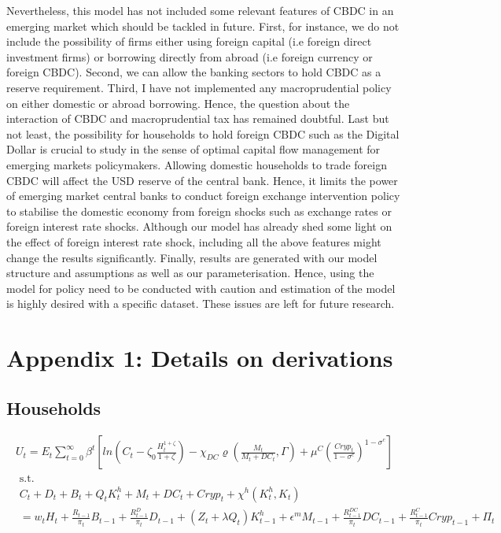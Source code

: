\documentclass[12pt, a4paper]{article}
\begin{document}
Nevertheless, this model has not included some relevant features of CBDC in an emerging market which should be tackled in future. First, for instance, we do not include the possibility of firms either using foreign capital (i.e foreign direct investment firms) or borrowing directly from abroad (i.e foreign currency or foreign CBDC). Second, we can allow the banking sectors to hold CBDC as a reserve requirement. Third, I have not implemented any macroprudential policy on either domestic or abroad borrowing. Hence, the question about the interaction of CBDC and macroprudential tax has remained doubtful. Last but not least, the possibility for households to hold foreign CBDC such as the Digital Dollar is crucial to study in the sense of optimal capital flow management for emerging markets policymakers. Allowing domestic households to trade foreign CBDC will affect the USD reserve of the central bank. Hence, it limits the power of emerging market central banks to conduct foreign exchange intervention policy to stabilise the domestic economy from foreign shocks such as exchange rates or foreign interest rate shocks. Although our model has already shed some light on the effect of foreign interest rate shock, including all the above features might change the results significantly. Finally, results are generated with our model structure and assumptions as well as our parameterisation. Hence, using the model for policy need to be conducted with caution and estimation of the model is highly desired with a specific dataset. These issues are left for future research.

\newpage



\newpage
\appendix
{} %

\section{Appendix 1: Details on derivations}
\subsection{Households}
\begin{align}
   U_t=  E_t \sum_{t=0}^{\infty} \beta^t\left[ ln\left(C_t-\zeta_{0}\frac{H_t^{1+\zeta}}{1+\zeta}\right) -\chi_{DC}\varrho\left(\frac{M_t}{M_t+DC_t},\Gamma\right) +\mu^C\left(\frac{Cryp_t}{1-\sigma^c}\right)^{1-\sigma^c}\right] 
\end{align}
\begin{align*}
&\text{s.t.}  \nonumber\\
  & C_t + D_{t} + B_t + Q_t K^h_t  + M_t + DC_t + Cryp_t +\chi^h(K^h_t,K_t) \\   
 & = w_t H_t + \frac{R_{t-1}}{\pi_t} B_{t-1}+ \frac{R^D_{t-1}}{\pi_t} D_{t-1} + (Z_t+ \lambda Q_t) K^h_{t-1} + \epsilon^m M_{t-1} + \frac{R^{DC}_{t-1}}{\pi_t} DC_{t-1} +\frac{R^{C}_{t-1}}{\pi_t} Cryp_{t-1}  +\Pi_t 
\end{align*}
\end{document}
